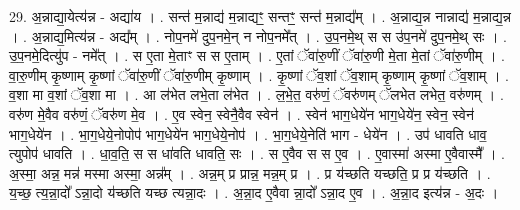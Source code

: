 \documentclass[17pt]{extarticle}
\begin{document}
29. अ॒न्नाद्या॒येत्य॑न्न - अद्या॑य । . सन्त॑ म॒न्नाद्य॑ म॒न्नाद्यꣳ॒॒ सन्तꣳ॒॒ सन्त॑ म॒न्नाद्य᳚म् । . अ॒न्नाद्य॒न्न नान्नाद्य॑ म॒न्नाद्य॒न्न । . अ॒न्नाद्य॒मित्य॑न्न - अद्य᳚म् । . नोप॒नमे॑ दुप॒नमे॒न् न नोप॒नमे᳚त् । . उ॒प॒नमे॒थ् स स उ॑प॒नमे॑ दुप॒नमे॒थ् सः । . उ॒प॒नमे॒दित्यु॑प - नमे᳚त् । . स ए॒ता मे॒ताꣳ स स ए॒ताम् । . ए॒तां ॅवा॑रु॒णीं ॅवा॑रु॒णी मे॒ता मे॒तां ॅवा॑रु॒णीम् । . वा॒रु॒णीम् कृ॒ष्णाम् कृ॒ष्णां ॅवा॑रु॒णीं ॅवा॑रु॒णीम् कृ॒ष्णाम् । . कृ॒ष्णां ॅव॒शां ॅव॒शाम् कृ॒ष्णाम् कृ॒ष्णां ॅव॒शाम् । . व॒शा मा व॒शां ॅव॒शा मा । . आ ल॑भेत लभे॒ता ल॑भेत । . ल॒भे॒त॒ वरु॑णं॒ ॅवरु॑णम् ॅलभेत लभेत॒ वरु॑णम् । . वरु॑ण मे॒वैव वरु॑णं॒ ॅवरु॑ण मे॒व । . ए॒व स्वेन॒ स्वेनै॒वैव स्वेन॑ । . स्वेन॑ भाग॒धेये॑न भाग॒धेये॑न॒ स्वेन॒ स्वेन॑ भाग॒धेये॑न । . भा॒ग॒धेये॒नोपोप॑ भाग॒धेये॑न भाग॒धेये॒नोप॑ । . भा॒ग॒धेये॒नेति॑ भाग - धेये॑न । . उप॑ धावति धाव॒ त्युपोप॑ धावति । . धा॒व॒ति॒ स स धा॑वति धावति॒ सः । . स ए॒वैव स स ए॒व । . ए॒वास्मा॑ अस्मा ए॒वैवास्मै᳚ । . अ॒स्मा॒ अन्न॒ मन्न॑ मस्मा अस्मा॒ अन्न᳚म् । . अन्न॒म् प्र प्रान्न॒ मन्न॒म् प्र । . प्र य॑च्छति यच्छति॒ प्र प्र य॑च्छति । . य॒च्छ॒ त्य॒न्ना॒दो᳚ ऽन्ना॒दो य॑च्छति यच्छ त्यन्ना॒दः । . अ॒न्ना॒द ए॒वैवा न्ना॒दो᳚ ऽन्ना॒द ए॒व । . अ॒न्ना॒द इत्य॑न्न - अ॒दः । \newline
\end{document}
